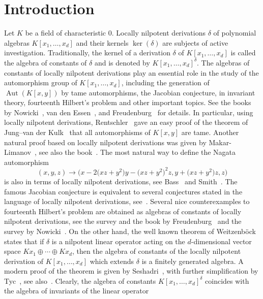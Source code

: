 \documentclass[11pt]{article}
\numberwithin{equation}{section}
\begin{document}
\section{Introduction}
Let $K$ be a field of characteristic 0. Locally nilpotent derivations $\delta$ of polynomial algebras $K[x_1,\ldots,x_d]$ and their kernels $\ker(\delta)$ are subjects of active investigation. Traditionally, the kernel of a derivation $\delta$ of $K[x_1,\ldots,x_d]$ is called the algebra of constants of $\delta$ and is denoted by $K[x_1,\ldots,x_d]^{\delta}$. The algebras of constants of locally nilpotent derivations play an essential role in the study of the automorphism group of $K[x_1,\ldots,x_d]$,
including the generation of $\operatorname{Aut}(K[x,y])$ by tame automorphisms, the Jacobian conjecture, in invariant theory, fourteenth Hilbert's problem and other important topics. See the books by Nowicki~\cite{No1}, van den Essen~\cite{E}, and Freudenburg~\cite{Fr2} for details. In particular, using locally nilpotent derivations,
Rentschler~\cite{R} gave an easy proof of the theorem of Jung--van der Kulk~\cite{J, K} that all automorphisms of $K[x,y]$ are tame. Another natural proof based on locally nilpotent derivations was given by Makar-Limanov~\cite{ML2}, see also the book~\cite{D1}. The most natural way to define the Nagata automorphism~\cite{Na}
\[
(x,y,z)\to\big(x-2\big(xz+y^2\big)y-\big(xz+y^2\big)^2z,y+\big(xz+y^2\big)z,z\big)
\]
is also in terms of locally nilpotent derivations, see Bass~\cite{B} and Smith~\cite{Sm}. The famous Jacobian conjecture is equivalent to several conjectures stated in the language of locally nilpotent derivations, see~\cite{E}. Several nice counterexamples to fourteenth Hilbert's problem are obtained as algebras of constants of locally nilpotent derivations, see the survey and the book by Freudenburg~\cite{Fr1, Fr2} and the survey by Nowicki~\cite{No2}. On the other hand, the well known theorem of Weitzenb\"ock~\cite{W} states that if $\delta$ is a nilpotent linear operator acting on the $d$-dimensional vector space $Kx_1\oplus \cdots\oplus Kx_d$, then the algebra of constants of the locally nilpotent derivation of $K[x_1,\ldots,x_d]$ which extends $\delta$ is a finitely generated algebra. A modern proof of the theorem is given by Seshadri~\cite{Ses}, with further simplification by Tyc~\cite{T}, see also~\cite{No1}. Clearly, the algebra of constants $K[x_1,\ldots,x_d]^{\delta}$ coincides with the algebra of invariants of the linear operator

\setcounter{section}{1}
\setcounter{subsection}{0}
\setcounter{subsubsection}{0}
\setcounter{Theorem}{0}
\setcounter{equation}{0}
\end{document}
